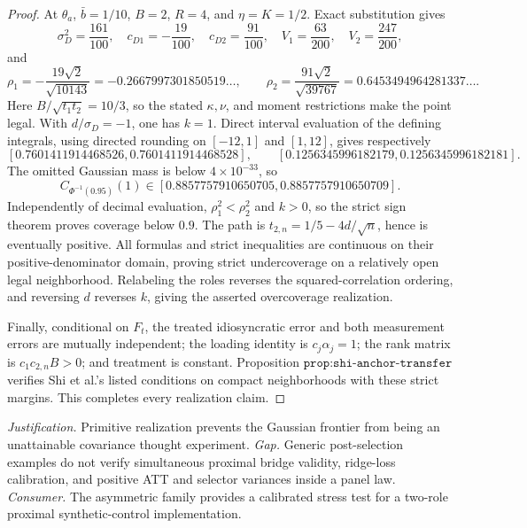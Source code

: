 \documentclass{article}
\begin{document}
\begin{proof}
At \(\theta_a\), \(\bar b=1/10\), \(B=2\), \(R=4\), and \(\eta=K=1/2\).  Exact substitution gives
\[
 \sigma_D^2=\frac{161}{100},\quad c_{D1}=-\frac{19}{100},
 \quad c_{D2}=\frac{91}{100},\quad
 V_1=\frac{63}{200},\quad V_2=\frac{247}{200},
\]
and
\[
 \rho_1=-\frac{19\sqrt2}{\sqrt{10143}}=-0.2667997301850519\ldots,
 \qquad
 \rho_2=\frac{91\sqrt2}{\sqrt{39767}}=0.6453494964281337\ldots.
\]
Here \(B/\sqrt{t_1t_2}=10/3\), so the stated \(\kappa,\nu\), and moment restrictions make the point legal.  With \(d/\sigma_D=-1\), one has \(k=1\).  Direct interval evaluation of the defining integrals, using directed rounding on \([-12,1]\) and \([1,12]\), gives respectively
\[
 [0.7601411914468526,0.7601411914468528],
 \qquad
 [0.1256345996182179,0.1256345996182181].
\]
The omitted Gaussian mass is below \(4\times10^{-33}\), so
\[
 C_{\Phi^{-1}(0.95)}(1)
 \in[0.8857757910650705,0.8857757910650709].
\]
Independently of decimal evaluation, \(\rho_1^2<\rho_2^2\) and \(k>0\), so the strict sign theorem proves coverage below \(0.9\).  The path is \(t_{2,n}=1/5-4d/\sqrt n\), hence is eventually positive.  All formulas and strict inequalities are continuous on their positive-denominator domain, proving strict undercoverage on a relatively open legal neighborhood.  Relabeling the roles reverses the squared-correlation ordering, and reversing \(d\) reverses \(k\), giving the asserted overcoverage realization.

Finally, conditional on \(F_t\), the treated idiosyncratic error and both measurement errors are mutually independent; the loading identity is \(c_j\alpha_j=1\); the rank matrix is \(c_1c_{2,n}B>0\); and treatment is constant.  Proposition \(\texttt{prop:shi-anchor-transfer}\) verifies Shi et al.'s listed conditions on compact neighborhoods with these strict margins.  This completes every realization claim.
\end{proof}
\par\smallskip\noindent \textit{Justification.} Primitive realization prevents the Gaussian frontier from being an unattainable covariance thought experiment. \textit{Gap.} Generic post-selection examples do not verify simultaneous proximal bridge validity, ridge-loss calibration, and positive ATT and selector variances inside a panel law. \textit{Consumer.} The asymmetric family provides a calibrated stress test for a two-role proximal synthetic-control implementation.
\end{document}
